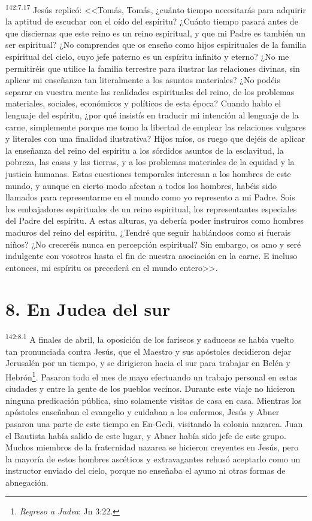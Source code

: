 \par 
\textsuperscript{142:7.17} Jesús replicó: <<Tomás, Tomás, ¿cuánto tiempo necesitarás para adquirir la aptitud de escuchar con el oído del espíritu? ¿Cuánto tiempo pasará antes de que disciernas que este reino es un reino espiritual, y que mi Padre es también un ser espiritual? ¿No comprendes que os enseño como hijos espirituales de la familia espiritual del cielo, cuyo jefe paterno es un espíritu infinito y eterno? ¿No me permitiréis que utilice la familia terrestre para ilustrar las relaciones divinas, sin aplicar mi enseñanza tan literalmente a los asuntos materiales? ¿No podéis separar en vuestra mente las realidades espirituales del reino, de los problemas materiales, sociales, económicos y políticos de esta época? Cuando hablo el lenguaje del espíritu, ¿por qué insistís en traducir mi intención al lenguaje de la carne, simplemente porque me tomo la libertad de emplear las relaciones vulgares y literales con una finalidad ilustrativa? Hijos míos, os ruego que dejéis de aplicar la enseñanza del reino del espíritu a los sórdidos asuntos de la esclavitud, la pobreza, las casas y las tierras, y a los problemas materiales de la equidad y la justicia humanas. Estas cuestiones temporales interesan a los hombres de este mundo, y aunque en cierto modo afectan a todos los hombres, habéis sido llamados para representarme en el mundo como yo represento a mi Padre. Sois los embajadores espirituales de un reino espiritual, los representantes especiales del Padre del espíritu. A estas alturas, ya debería poder instruiros como hombres maduros del reino del espíritu. ¿Tendré que seguir hablándoos como si fuerais niños? ¿No creceréis nunca en percepción espiritual? Sin embargo, os amo y seré indulgente con vosotros hasta el fin de nuestra asociación en la carne. E incluso entonces, mi espíritu os precederá en el mundo entero>>.

\section*{8. En Judea del sur}
\par 
\textsuperscript{142:8.1} A finales de abril, la oposición de los fariseos y saduceos se había vuelto tan pronunciada contra Jesús, que el Maestro y sus apóstoles decidieron dejar Jerusalén por un tiempo, y se dirigieron hacia el sur para trabajar en Belén y Hebrón\footnote{\textit{Regreso a Judea}: Jn 3:22.}. Pasaron todo el mes de mayo efectuando un trabajo personal en estas ciudades y entre la gente de los pueblos vecinos. Durante este viaje no hicieron ninguna predicación pública, sino solamente visitas de casa en casa. Mientras los apóstoles enseñaban el evangelio y cuidaban a los enfermos, Jesús y Abner pasaron una parte de este tiempo en En-Gedi, visitando la colonia nazarea. Juan el Bautista había salido de este lugar, y Abner había sido jefe de este grupo. Muchos miembros de la fraternidad nazarea se hicieron creyentes en Jesús, pero la mayoría de estos hombres ascéticos y extravagantes rehusó aceptarlo como un instructor enviado del cielo, porque no enseñaba el ayuno ni otras formas de abnegación.

